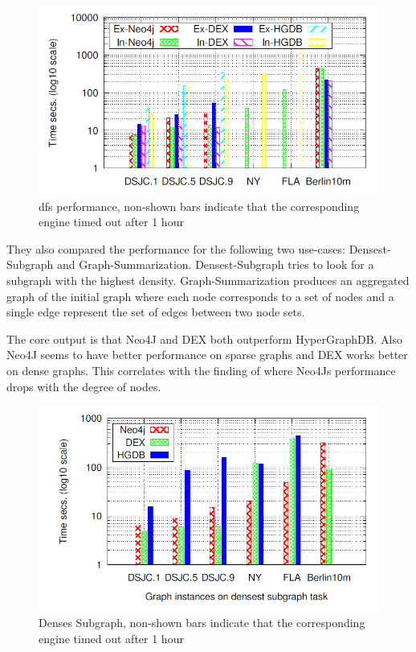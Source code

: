\documentclass{acm_proc_article-sp}
\begin{document}
\begin{figure}[hbtp]
	\centering
	\includegraphics[scale=0.32]{dfs.png}
	\caption{dfs performance, non-shown bars indicate that
		the corresponding engine timed out after 1 hour\cite{comparision}}
\end{figure}
They also compared the performance for the following two use-cases: Densest-Subgraph and Graph-Summarization. Densest-Subgraph tries to look for a subgraph with the highest density. Graph-Summarization produces an aggregated graph of the initial graph where each node corresponds to a set of nodes and a single edge represent the set of edges between two node sets.

The core output is that Neo4J and DEX both outperform HyperGraphDB. Also Neo4J seems to have better performance on sparse graphs and DEX works better on dense graphs. This correlates with the finding of \cite{healtcare} where Neo4Js performance drops with the degree of nodes.
\begin{figure}[hbtp]
	\centering
	\includegraphics[scale=0.32]{dense.png}
	\caption{Denses Subgraph, non-shown bars indicate that
		the corresponding engine timed out after 1 hour\cite{comparision}}
\end{figure}
\end{document}
